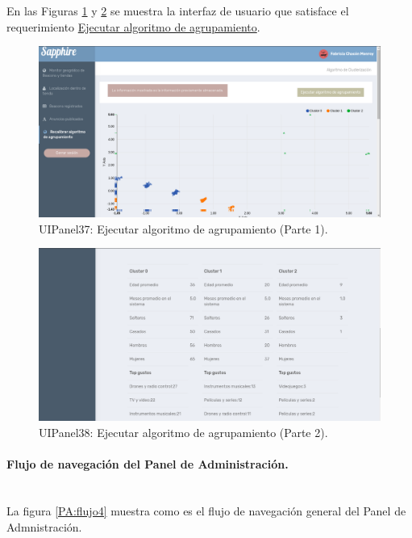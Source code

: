 En las Figuras \ref{PA:cluster1} y \ref{PA:cluster2} se muestra la interfaz de usuario que satisface el requerimiento \hyperlink{RFPA}{Ejecutar algoritmo de agrupamiento}.
\FloatBarrier
\begin{figure}[htbp!]
		\centering
			\includegraphics[width=1 \textwidth]{imagenes/UI/prototipo4/cluster}
		\caption{UIPanel37: Ejecutar algoritmo de agrupamiento (Parte 1).}
		\label{PA:cluster1}
\end{figure}
\FloatBarrier

\FloatBarrier
\begin{figure}[htbp!]
		\centering
			\includegraphics[width=1 \textwidth]{imagenes/UI/prototipo4/cluster2}
		\caption{UIPanel38: Ejecutar algoritmo de agrupamiento (Parte 2).}
		\label{PA:cluster2}
\end{figure}
\FloatBarrier


\paragraph{Flujo de navegación del Panel de Administración.} ~\\

La figura \ref{PA:flujo4} muestra como es el flujo de navegación general del Panel de Admnistración.

